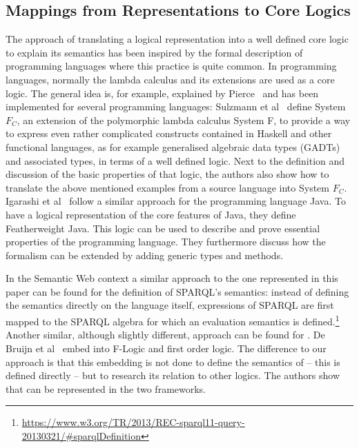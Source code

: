 \subsection{Mappings from Representations to Core Logics}
The approach of translating a logical representation into a well defined core logic to explain its semantics has been inspired by the formal description of 
programming languages where this practice is quite 
common. In programming languages, normally the lambda calculus and its extensions are used as a core logic. The general idea is, for example, explained by Pierce~\cite{Pierce}
and has been implemented for several programming languages: Sulzmann et al~\cite{Sulzmann} define System $F_C$, an extension of the polymorphic lambda calculus System F, to provide 
a way to express even rather complicated constructs contained in Haskell and other functional languages, as for example generalised algebraic data types (GADTs) and associated types,
in terms of a well defined logic.
Next to the definition and discussion of the basic properties of that logic, the authors also show how to translate the above mentioned examples from a
source language  into System $F_C$.
Igarashi et al~\cite{Igarashi} follow a similar approach for the programming language Java. To have a logical representation of the core features of Java, they define 
Featherweight Java. This logic can be used to describe and prove essential properties of the programming language. They furthermore discuss how the formalism can be extended 
by adding generic types and methods.

In the Semantic Web context a similar approach to the one represented in this paper can be found for the definition of SPARQL's semantics: 
instead of defining the semantics directly 
on the language itself, expressions of SPARQL are first mapped to the SPARQL algebra %
for which an evaluation 
semantics is defined.\footnote{\url{https://www.w3.org/TR/2013/REC-sparql11-query-20130321/\#sparqlDefinition}}
Another similar, although slightly different, approach can be found for \rdf. De Bruijn et al~\cite{erdf} embed \rdf into F-Logic and first order logic. The difference to our
approach is that this embedding is not done to define the semantics of \rdf{} -- this is defined directly -- but to research its relation to other logics.
The authors show that \rdf can be represented in the two frameworks.



